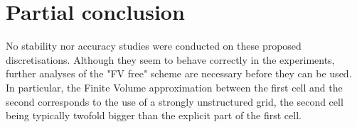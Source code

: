 \section{Partial conclusion}
No stability nor accuracy studies were conducted on these proposed
discretisations. Although they seem to behave correctly in the
experiments, further analyses of the "FV free" scheme are
necessary before they can be used. In particular,
the Finite Volume approximation between the first cell and the second
corresponds to the use of a strongly unstructured grid,
the second cell being typically twofold bigger than
the explicit part of the first cell.

